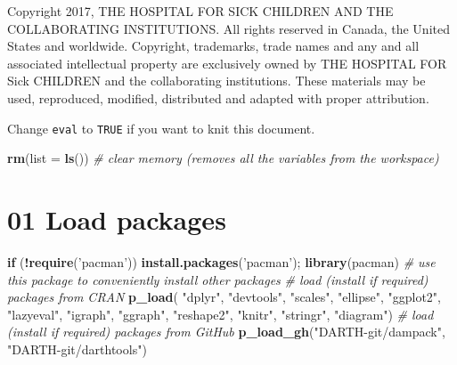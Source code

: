 \documentclass[
]{article}
\newenvironment{Shaded}{\begin{snugshade}}{\end{snugshade}}
\newcommand{\CommentTok}[1]{\textcolor[rgb]{0.56,0.35,0.01}{\textit{#1}}}
\newcommand{\ControlFlowTok}[1]{\textcolor[rgb]{0.13,0.29,0.53}{\textbf{#1}}}
\newcommand{\DataTypeTok}[1]{\textcolor[rgb]{0.13,0.29,0.53}{#1}}
\newcommand{\KeywordTok}[1]{\textcolor[rgb]{0.13,0.29,0.53}{\textbf{#1}}}
\newcommand{\NormalTok}[1]{#1}
\newcommand{\OperatorTok}[1]{\textcolor[rgb]{0.81,0.36,0.00}{\textbf{#1}}}
\newcommand{\StringTok}[1]{\textcolor[rgb]{0.31,0.60,0.02}{#1}}
\begin{document}
Copyright 2017, THE HOSPITAL FOR SICK CHILDREN AND THE COLLABORATING
INSTITUTIONS. All rights reserved in Canada, the United States and
worldwide. Copyright, trademarks, trade names and any and all associated
intellectual property are exclusively owned by THE HOSPITAL FOR Sick
CHILDREN and the collaborating institutions. These materials may be
used, reproduced, modified, distributed and adapted with proper
attribution.

\newpage

Change \texttt{eval} to \texttt{TRUE} if you want to knit this document.

\begin{Shaded}
\begin{Highlighting}[]
\KeywordTok{rm}\NormalTok{(}\DataTypeTok{list =} \KeywordTok{ls}\NormalTok{())      }\CommentTok{# clear memory (removes all the variables from the workspace)}
\end{Highlighting}
\end{Shaded}

\hypertarget{load-packages}{%
\section{01 Load packages}\label{load-packages}}

\begin{Shaded}
\begin{Highlighting}[]
\ControlFlowTok{if}\NormalTok{ (}\OperatorTok{!}\KeywordTok{require}\NormalTok{(}\StringTok{'pacman'}\NormalTok{)) }\KeywordTok{install.packages}\NormalTok{(}\StringTok{'pacman'}\NormalTok{); }\KeywordTok{library}\NormalTok{(pacman) }\CommentTok{# use this package to conveniently install other packages}
\CommentTok{# load (install if required) packages from CRAN}
\KeywordTok{p_load}\NormalTok{( }\StringTok{"dplyr"}\NormalTok{, }\StringTok{"devtools"}\NormalTok{, }\StringTok{"scales"}\NormalTok{, }\StringTok{"ellipse"}\NormalTok{, }\StringTok{"ggplot2"}\NormalTok{, }\StringTok{"lazyeval"}\NormalTok{, }\StringTok{"igraph"}\NormalTok{, }\StringTok{"ggraph"}\NormalTok{, }\StringTok{"reshape2"}\NormalTok{, }\StringTok{"knitr"}\NormalTok{, }\StringTok{"stringr"}\NormalTok{, }\StringTok{"diagram"}\NormalTok{)   }
\CommentTok{# load (install if required) packages from GitHub}
\KeywordTok{p_load_gh}\NormalTok{(}\StringTok{"DARTH-git/dampack"}\NormalTok{, }\StringTok{"DARTH-git/darthtools"}\NormalTok{)}
\end{Highlighting}
\end{Shaded}
\end{document}
